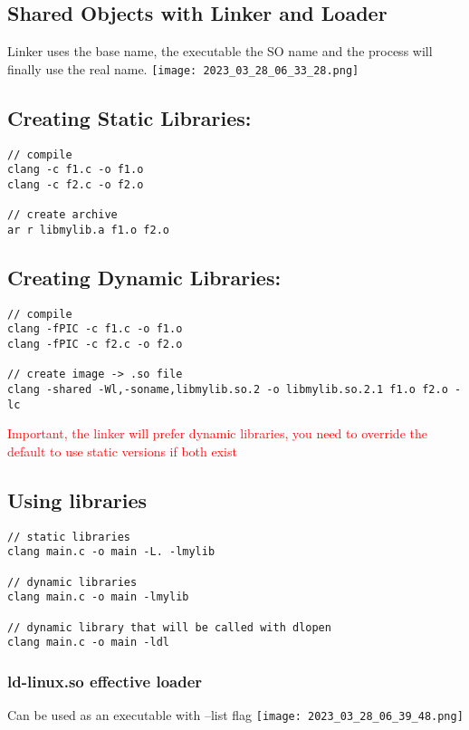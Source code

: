 \documentclass[main.tex,fontsize=8pt,paper=a4,paper=portrait,DIV=calc,]{scrartcl}
\begin{document}
\subsection{Shared Objects with Linker and Loader}
Linker uses the base name, the executable the SO name and the process will finally use the real name.\newline
\texttt{[image: 2023\_03\_28\_06\_33\_28.png]}

\subsection{Creating Static Libraries:}
\begin{lstlisting}
// compile 
clang -c f1.c -o f1.o
clang -c f2.c -o f2.o

// create archive
ar r libmylib.a f1.o f2.o
\end{lstlisting}

\subsection{Creating Dynamic Libraries:}
\begin{lstlisting}
// compile
clang -fPIC -c f1.c -o f1.o
clang -fPIC -c f2.c -o f2.o

// create image -> .so file
clang -shared -Wl,-soname,libmylib.so.2 -o libmylib.so.2.1 f1.o f2.o -lc
\end{lstlisting}
\textcolor{red}{Important, the linker will prefer dynamic libraries, you need to override the default to use static versions if both exist}

\subsection{Using libraries}
\begin{lstlisting}
// static libraries
clang main.c -o main -L. -lmylib

// dynamic libraries
clang main.c -o main -lmylib

// dynamic library that will be called with dlopen
clang main.c -o main -ldl
\end{lstlisting}

\subsubsection{ld-linux.so effective loader}
Can be used as an executable with --list flag\newline
\texttt{[image: 2023\_03\_28\_06\_39\_48.png]}
\end{document}
